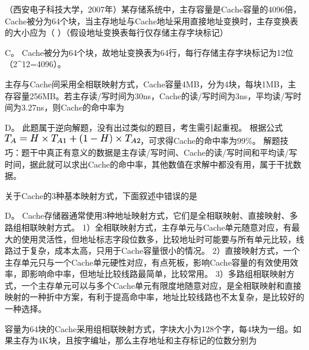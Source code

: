 \question （西安电子科技大学，2007年）某存储系统中，主存容量是Cache容量的4096倍，Cache被分为64个块，当主存地址与Cache地址采用直接地址变换时，主存变换表的大小应为（
）（假设地址变换表每行仅存储主存字块标记）
\par{}
\begin{solution}C。
Cache被分为64个块，故地址变换表为64行，每行存储主存字块标记为12位（2\^{}12=4096）。
\end{solution}
\question 主存与Cache间采用全相联映射方式，Cache容量4MB，分为4块，每块1MB，主存容量256MB。若主存读/写时间为30ns，Cache的读/写时间为3ns，平均读/写时间为3.27ns，则Cache的命中率为
\par{}
\begin{solution}D。 此题属于逆向解题，没有出过类似的题目，考生需引起重视。
根据公式\includegraphics[width=2.37500in,height=0.18750in]{texmath/9082595Cdpi7B3507D7BT_A7D3DH5Ctimes7BT_7BA17D7D2B281-H295Ctimes7BT_7BA27D7D}，可求得Cache的命中率为99\%。
解题技巧：题干中真正有意义的数据是主存读/写时间、Cache的读/写时间和平均读/写时间，据此就可以求出Cache的命中率，其他数值在求解中都没有用，属于干扰数据。
\end{solution}
\question 关于Cache的3种基本映射方式，下面叙述中错误的是
\par{}
\begin{solution}D。
Cache存储器通常使用3种地址映射方式，它们是全相联映射、直接映射、多路组相联映射方式。
1）全相联映射方式，主存单元与Cache单元随意对应，有最大的使用灵活性，但地址标志字段位数多，比较地址时可能要与所有单元比较，线路过于复杂，成本太高，只用于Cache容量很小的情况。
2）直接映射方式，一个主存单元只与一个Cache单元硬性对应，有点死板，影响Cache容量的有效使用效率，即影响命中率，但地址比较线路最简单，比较常用。
3）多路组相联映射方式，一个主存单元可以与多个Cache单元有限度地随意对应，是全相联映射和直接映射的一种折中方案，有利于提高命中率，地址比较线路也不太复杂，是比较好的一种选择。
\end{solution}
\question 容量为64块的Cache采用组相联映射方式，字块大小为128个字，每4块为一组。如果主存为4K块，且按字编址，那么主存地址和主存标记的位数分别为
